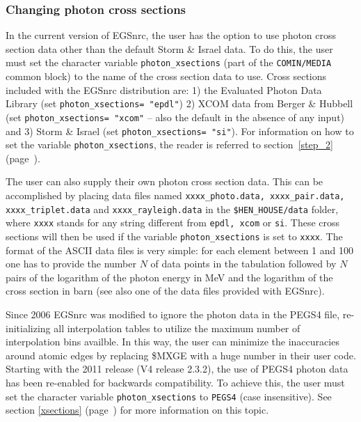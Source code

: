 \subsubsection{Changing photon cross sections}
\label{photon_xsect}

In the current version of EGSnrc, the user has the option to use
photon cross section data other than the default
Storm \& Israel data.  To do this, the user must
set the character variable {\tt photon\_xsections} (part of the
{\tt COMIN/MEDIA} common block) to the name of the cross section
data to use.  Cross sections included with the EGSnrc distribution
are: 1) the Evaluated Photon Data
Library\cite{Cu97a} (set {\tt photon\_xsections= "epdl"})
2) XCOM data from Berger \& Hubbell\cite{BH87} (set {\tt photon\_xsections= "xcom"}
-- also the default in the absence of any input)
and 3) Storm \& Israel\cite{SI70} (set {\tt photon\_xsections= "si"}). For information on how
to set the variable {\tt photon\_xsections}, the reader
is referred to section~\ref{step_2} (page~\pageref{photon_xsections_description}).

The user can also supply their own photon cross section data.
This can be accomplished by placing data files named 
{\tt xxxx\_photo.data, xxxx\_pair.data, xxxx\_triplet.data} and {\tt xxxx\_rayleigh.data} 
in the {\tt \$HEN\_HOUSE/data} folder, where {\tt xxxx} stands for any string different 
from {\tt epdl, xcom} or {\tt si}. These cross sections will then be used if 
the variable {\tt photon\_xsections} is set to {\tt xxxx}. The format of the 
ASCII data files is very simple: for each element between 1 and 100 one has to 
provide the number $N$ of data points in the tabulation followed by $N$ 
pairs of the logarithm of the photon energy in MeV and the logarithm of the 
cross section in barn (see also one of the data files provided with EGSnrc). 

Since 2006 EGSnrc was modified to ignore the photon data in the PEGS4
file, re-initializing all interpolation tables to utilize the 
maximum number of interpolation bins availble. In this way, the user 
can minimize the inaccuracies around atomic edges by replacing \$MXGE with 
a huge number in their user code. Starting with the 2011 release
(V4 release 2.3.2), the use of PEGS4 photon data has been re-enabled for
backwards compatibility.
To achieve this, the user must set the character variable 
{\tt photon\_xsections} to {\tt PEGS4} (case insensitive). See
section \ref{xsections} (page~\pageref{xsections}) for more 
information on this topic.

